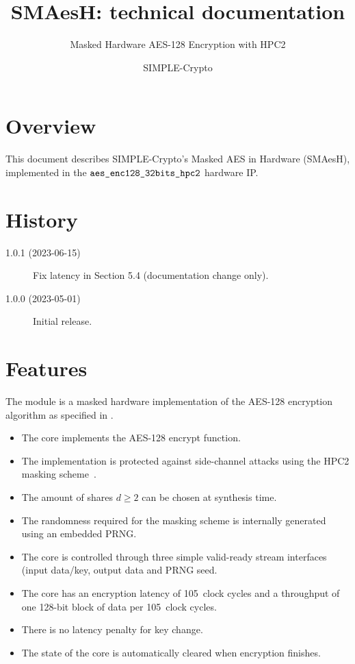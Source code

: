 \documentclass{scrartcl}
\title{SMAesH: technical documentation}
\subtitle{Masked Hardware AES-128 Encryption with HPC2}
\author{SIMPLE-Crypto}
\date{}
\begin{document}


\maketitle

\tableofcontents

\section{Overview}
\label{section:overview}
This document describes SIMPLE-Crypto's Masked AES in Hardware (SMAesH),
implemented in the $\texttt{aes\_enc128\_32bits\_hpc2}$ hardware IP. 

\section{History}

\begin{description}
    \item[1.0.1 (2023-06-15)] Fix latency in Section 5.4 (documentation change only).
    \item[1.0.0 (2023-05-01)] Initial release.
\end{description}

\section{Features}
The \core module is a masked hardware implementation of the AES-128 encryption
algorithm as specified in \cite{nist197}. 

\begin{itemize}
\item{The core implements the AES-128 encrypt function.}
\item{The implementation is protected against side-channel attacks using the HPC2 masking scheme~\cite{DBLP:journals/tc/CassiersGLS21}.}
\item{The amount of shares $d\ge 2$ can be chosen at synthesis time.}
\item{The randomness required for the masking scheme is internally generated using an embedded PRNG.}
\item{The core is controlled through three simple valid-ready stream interfaces (input data/key, output data and PRNG seed.}
\item{The core has an encryption latency of 105~clock cycles and a throughput of one 128-bit block of data per 105~clock cycles.}
\item{There is no latency penalty for key change.}
\item{The state of the core is automatically cleared when encryption finishes.}
\end{itemize}
\end{document}

